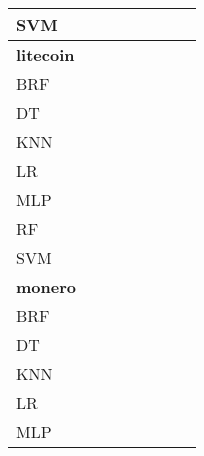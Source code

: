 \documentclass{article}
\begin{document}
{\begin{tabular}{|l|c|c|c|c|c|c|c|}
SVM & \cellcolor{white}  & \cellcolor{white}  & \cellcolor{white}  & \cellcolor{white}  & \cellcolor{white}  & \cellcolor{white}  & \cellcolor{gray}  \\ 
\hline
\textbf{litecoin} \\ \hline
BRF & \cellcolor{gray}  & \cellcolor{white}  & \cellcolor{white}  & \cellcolor{black}  & \cellcolor{black}  & \cellcolor{white}  & \cellcolor{black}  \\ 
DT & \cellcolor{white}  & \cellcolor{gray}  & \cellcolor{white}  & \cellcolor{black}  & \cellcolor{black}  & \cellcolor{white}  & \cellcolor{black}  \\ 
KNN & \cellcolor{white}  & \cellcolor{white}  & \cellcolor{gray}  & \cellcolor{black}  & \cellcolor{black}  & \cellcolor{white}  & \cellcolor{black}  \\ 
LR & \cellcolor{white}  & \cellcolor{white}  & \cellcolor{white}  & \cellcolor{gray}  & \cellcolor{white}  & \cellcolor{white}  & \cellcolor{white}  \\ 
MLP & \cellcolor{white}  & \cellcolor{white}  & \cellcolor{white}  & \cellcolor{black}  & \cellcolor{gray}  & \cellcolor{white}  & \cellcolor{white}  \\ 
RF & \cellcolor{white}  & \cellcolor{white}  & \cellcolor{white}  & \cellcolor{black}  & \cellcolor{black}  & \cellcolor{gray}  & \cellcolor{black}  \\ 
SVM & \cellcolor{white}  & \cellcolor{white}  & \cellcolor{white}  & \cellcolor{black}  & \cellcolor{white}  & \cellcolor{white}  & \cellcolor{gray}  \\ 
\hline
\textbf{monero} \\ \hline
BRF & \cellcolor{gray}  & \cellcolor{white}  & \cellcolor{white}  & \cellcolor{black}  & \cellcolor{black}  & \cellcolor{white}  & \cellcolor{black}  \\ 
DT & \cellcolor{white}  & \cellcolor{gray}  & \cellcolor{white}  & \cellcolor{black}  & \cellcolor{black}  & \cellcolor{white}  & \cellcolor{black}  \\ 
KNN & \cellcolor{white}  & \cellcolor{white}  & \cellcolor{gray}  & \cellcolor{black}  & \cellcolor{black}  & \cellcolor{white}  & \cellcolor{black}  \\ 
LR & \cellcolor{white}  & \cellcolor{white}  & \cellcolor{white}  & \cellcolor{gray}  & \cellcolor{white}  & \cellcolor{white}  & \cellcolor{white}  \\ 
MLP & \cellcolor{white}  & \cellcolor{white}  & \cellcolor{white}  & \cellcolor{white}  & \cellcolor{gray}  & \cellcolor{white}  & \cellcolor{white}  \\ 

\end{tabular}}
\end{document}
